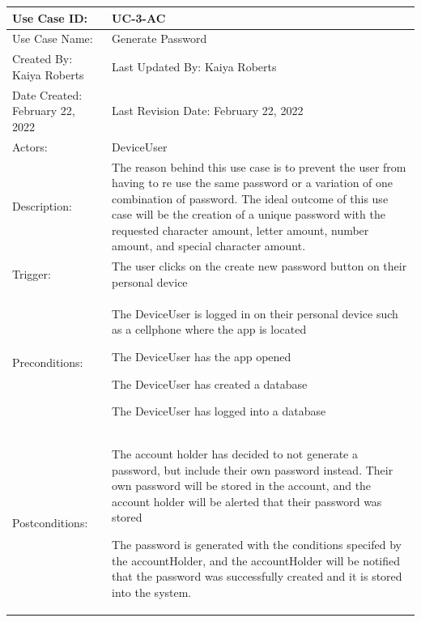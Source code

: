 \documentclass[stu]{apa7}
\newcommand{\nextitem}{\par\hspace*{\labelsep}\textbullet\hspace*{\labelsep}}
\begin{document}
\scriptsize{\begin{xltabular}{\textwidth}{|l|X|}
  \hline Use Case ID: & UC-3-AC \\ \hline

  Use Case Name: & Generate Password \\ \hline

  Created By: Kaiya Roberts & Last Updated By: Kaiya Roberts \\ \hline

  Date Created: February 22, 2022 & Last Revision Date: February 22, 2022 \\ \hline

  Actors: & \nextitem DeviceUser \\ \hline
  
  Description: &  The reason behind this use case is to prevent the user from having to re use the same password or a variation of one combination of password. The ideal outcome of this use case will be the creation of a unique password with the requested character amount, letter amount, number amount, and special character amount. \\ \hline

  Trigger: & The user clicks on the create new password button on their personal device \\ \hline

  Preconditions: & \nextitem The DeviceUser is logged in on their personal device such as a cellphone where the app is located \nextitem The DeviceUser has the app opened \nextitem The DeviceUser has created a database \nextitem The DeviceUser has logged into a database \\ \hline

  Postconditions: & \nextitem The account holder has decided to not generate a password, but include their own password instead. Their own password will be stored in the account, and the account holder will be alerted that their password was stored \nextitem The password is generated with the conditions specifed by the accountHolder, and the accountHolder will be notified that the password was successfully created and it is stored into the system.  \\ \hline


\end{xltabular}}
\end{document}
